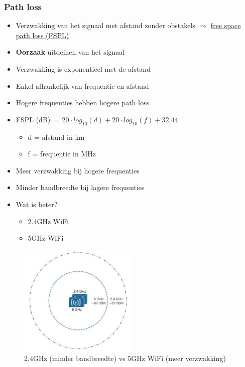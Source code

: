 \documentclass{article}
\newcommand{\bold}[1]{\textbf{#1}}
\begin{document}
\subsubsection{Path loss}
\begin{itemize}
    \item Verzwakking van het signaal met afstand zonder obstakels $\Rightarrow$ \underline{free space path loss (FSPL)}
    \item \bold{Oorzaak} uitdeinen van het signaal
    \item Verzwakking is exponentieel met de afstand
    \item Enkel afhankelijk van frequentie en afstand
    \item Hogere frequenties hebben hogere path loss
    \item FSPL (dB) $= 20\cdot log_{10}(d) + 20\cdot log_{10}(f) + 32.44$
    \begin{itemize}
        \item d = afstand in km
        \item f = frequentie in MHz
    \end{itemize}
    \item Meer verzwakking bij hogere frequenties
    \item Minder bandbreedte bij lagere frequenties
    \item Wat is beter?
    \begin{itemize}
        \item 2.4GHz WiFi
        \item 5GHz WiFi
    \end{itemize}
\end{itemize}

\begin{figure}[H]
    \centering
    \includegraphics[width=0.5\textwidth]{Screenshot_20200309_123426.png}
    \caption{2.4GHz (minder bandbreedte) vs 5GHz WiFi (meer verzwakking)}
\end{figure}
\end{document}
